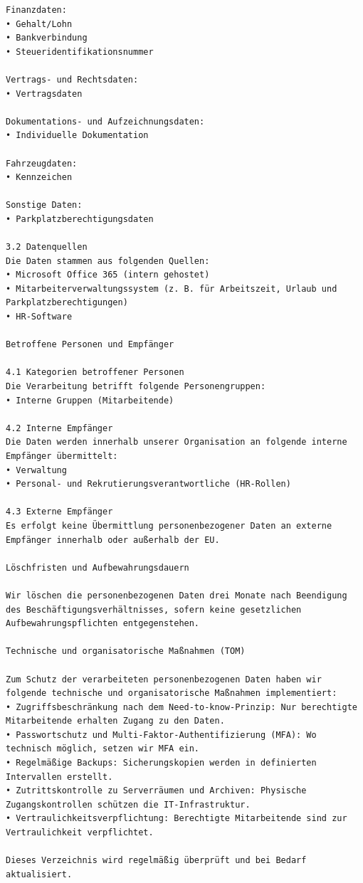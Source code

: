 \begin{lstlisting}
Finanzdaten:
• Gehalt/Lohn
• Bankverbindung
• Steueridentifikationsnummer

Vertrags- und Rechtsdaten:
• Vertragsdaten

Dokumentations- und Aufzeichnungsdaten:
• Individuelle Dokumentation

Fahrzeugdaten:
• Kennzeichen

Sonstige Daten:
• Parkplatzberechtigungsdaten

3.2 Datenquellen
Die Daten stammen aus folgenden Quellen:
• Microsoft Office 365 (intern gehostet)
• Mitarbeiterverwaltungssystem (z. B. für Arbeitszeit, Urlaub und Parkplatzberechtigungen)
• HR-Software

Betroffene Personen und Empfänger

4.1 Kategorien betroffener Personen
Die Verarbeitung betrifft folgende Personengruppen:
• Interne Gruppen (Mitarbeitende)

4.2 Interne Empfänger
Die Daten werden innerhalb unserer Organisation an folgende interne Empfänger übermittelt:
• Verwaltung
• Personal- und Rekrutierungsverantwortliche (HR-Rollen)

4.3 Externe Empfänger
Es erfolgt keine Übermittlung personenbezogener Daten an externe Empfänger innerhalb oder außerhalb der EU.

Löschfristen und Aufbewahrungsdauern

Wir löschen die personenbezogenen Daten drei Monate nach Beendigung des Beschäftigungsverhältnisses, sofern keine gesetzlichen Aufbewahrungspflichten entgegenstehen.

Technische und organisatorische Maßnahmen (TOM)

Zum Schutz der verarbeiteten personenbezogenen Daten haben wir folgende technische und organisatorische Maßnahmen implementiert:
• Zugriffsbeschränkung nach dem Need-to-know-Prinzip: Nur berechtigte Mitarbeitende erhalten Zugang zu den Daten.
• Passwortschutz und Multi-Faktor-Authentifizierung (MFA): Wo technisch möglich, setzen wir MFA ein.
• Regelmäßige Backups: Sicherungskopien werden in definierten Intervallen erstellt.
• Zutrittskontrolle zu Serverräumen und Archiven: Physische Zugangskontrollen schützen die IT-Infrastruktur.
• Vertraulichkeitsverpflichtung: Berechtigte Mitarbeitende sind zur Vertraulichkeit verpflichtet.

Dieses Verzeichnis wird regelmäßig überprüft und bei Bedarf aktualisiert.

\end{lstlisting}

